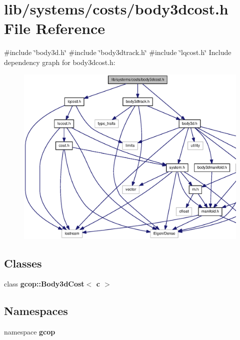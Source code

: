 \section{lib/systems/costs/body3dcost.h \-File \-Reference}
\label{body3dcost_8h}
{\ttfamily \#include \char`\"{}body3d.\-h\char`\"{}}\*
{\ttfamily \#include \char`\"{}body3dtrack.\-h\char`\"{}}\*
{\ttfamily \#include \char`\"{}lqcost.\-h\char`\"{}}\*
\-Include dependency graph for body3dcost.\-h\-:\nopagebreak
\begin{figure}[H]
\begin{center}
\leavevmode
\includegraphics[width=350pt]{body3dcost_8h__incl}
\end{center}
\end{figure}
\subsection*{\-Classes}
\begin{DoxyCompactItemize}
\item 
class {\bf gcop\-::\-Body3d\-Cost$<$ c $>$}
\end{DoxyCompactItemize}
\subsection*{\-Namespaces}
\begin{DoxyCompactItemize}
\item 
namespace {\bf gcop}
\end{DoxyCompactItemize}
